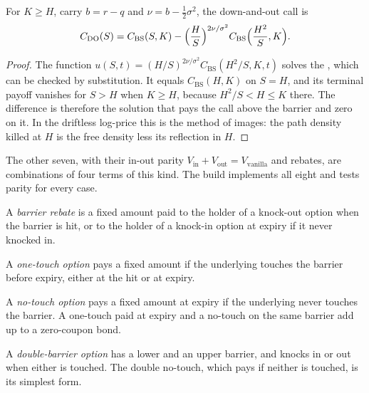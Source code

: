 \begin{proposition}\label{prop:dv:barriers-and-digitals:image}
For $K\ge H$, carry $b=r-q$ and $\nu=b-\frac12\sigma^2$, the down-and-out call is
\[
C_{\mathrm{DO}}(S)=C_{\mathrm{BS}}(S,K)-\Bigl(\frac HS\Bigr)^{2\nu/\sigma^2}C_{\mathrm{BS}}\Bigl(\frac{H^2}S,K\Bigr).
\]
\end{proposition}
\begin{proof}
The function $u(S,t)=(H/S)^{2\nu/\sigma^2}C_{\mathrm{BS}}(H^2/S,K,t)$ solves the , which can be
checked by substitution. It equals $C_{\mathrm{BS}}(H,K)$ on $S=H$, and its terminal payoff vanishes for $S>H$ when
$K\ge H$, because $H^2/S<H\le K$ there. The difference is therefore the solution that pays the call above the barrier
and zero on it. In the driftless log-price this is the method of images: the path density killed at $H$ is the free
density less its reflection in $H$.
\end{proof}

The other seven, with their in-out parity $V_{\mathrm{in}}+V_{\mathrm{out}}=V_{\mathrm{vanilla}}$ and rebates, are
combinations of four terms of this kind. The build implements all eight and tests parity for every case.

\begin{definition}\label{def:dv:barriers-and-digitals:rebate}
A \emph{barrier rebate} is a fixed amount paid to the holder of a knock-out option when the
barrier is hit, or to the holder of a knock-in option at expiry if it never knocked in.
\end{definition}

\begin{definition}\label{def:dv:barriers-and-digitals:onetouch}
A \emph{one-touch option} pays a fixed amount if the underlying touches the barrier before
expiry, either at the hit or at expiry.
\end{definition}

\begin{definition}\label{def:dv:barriers-and-digitals:notouch}
A \emph{no-touch option} pays a fixed amount at expiry if the underlying never touches the
barrier. A one-touch paid at expiry and a no-touch on the same barrier add up to a zero-coupon bond.
\end{definition}

\begin{definition}\label{def:dv:barriers-and-digitals:double}
A \emph{double-barrier option} has a lower and an upper barrier, and knocks in or out
when either is touched. The double no-touch, which pays if neither is touched, is its simplest form.
\end{definition}

